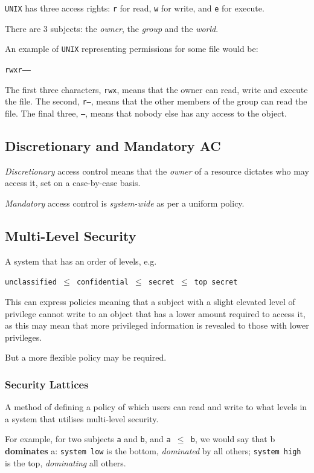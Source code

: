 \documentclass{article}
\begin{document}
\texttt{UNIX} has three access rights: \texttt{r} for read, \texttt{w} for write, and \texttt{e} for execute.

There are 3 subjects: the \textit{owner}, the \textit{group} and the \textit{world}.

An example of \texttt{UNIX} representing permissions for some file would be:

\texttt{rwxr-----}

The first three characters, \texttt{rwx}, means that the owner can read, write and execute the file. The second, \texttt{r--}, means that the other members of the group can read the file. The final three, \texttt{---}, means that nobody else has any access to the object.

\subsection{Discretionary and Mandatory AC}

\textit{Discretionary} access control means that the \textit{owner} of a resource dictates who may access it, set on a case-by-case basis.

\textit{Mandatory} access control is \textit{system-wide} as per a uniform policy.

\subsection{Multi-Level Security}

A system that has an order of levels, e.g.

\texttt{unclassified $\leq$ confidential $\leq$ secret $\leq$ top secret}

This can express policies meaning that a subject with a slight elevated level of privilege cannot write to an object that has a lower amount required to access it, as this may mean that more privileged information is revealed to those with lower privileges.

But a more flexible policy may be required.

\subsubsection{Security Lattices}

A method of defining a policy of which users can read and write to what levels in a system that utilises multi-level security.

For example, for two subjects \texttt{a} and \texttt{b}, and \texttt{a $\leq$ b}, we would say that b \textbf{dominates} a: \texttt{system low} is the bottom, \textit{dominated} by all others; \texttt{system high} is the top, \textit{dominating} all others.
\end{document}
